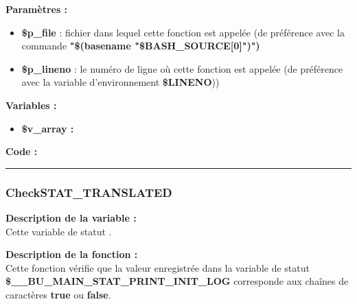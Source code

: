 \documentclass[a4paper,10pt]{article}
\begin{document}
\begin{justify}
    \textbf{Paramètres :}

    \begin{itemize}
        \item \color{orange}\textbf{\$p\_file}\color{white} : fichier dans lequel cette fonction est appelée (de préférence avec la commande \textbf{"\$(\color{gray}basename \color{white}"\color{orange}\$BASH\_SOURCE[0]\color{white}")")}\\

        \item \color{orange}\textbf{\$p\_lineno}\color{white} : le numéro de ligne où cette fonction est appelée (de préférence avec la variable d'environnement \textbf{\color{orange}\$LINENO}))
    \end{itemize}
\end{justify}

\begin{justify}
    \textbf{Variables :}

    \begin{itemize}
        \item \textbf{\color{orange}\$v\_array\color{white} :}
    \end{itemize}
\end{justify}

\begin{justify}
    \textbf{Code :}
\end{justify}



\color{blue}\par\noindent\rule{\textwidth}{0.4pt}\color{white}

\color{blue}
\subsubsection{CheckSTAT\_TRANSLATED}\color{white}

\begin{justify}
    \textbf{Description de la variable :}\\
    Cette variable de statut .
\end{justify}

\begin{justify}
    \textbf{Description de la fonction :}\\
    Cette fonction vérifie que la valeur enregistrée dans la variable de statut \textbf{\color{orange}\$\_\_BU\_MAIN\_STAT\_PRINT\_INIT\_LOG} corresponde aux chaînes de caractères \textbf{true} ou \textbf{false}.
\end{justify}
\end{document}
